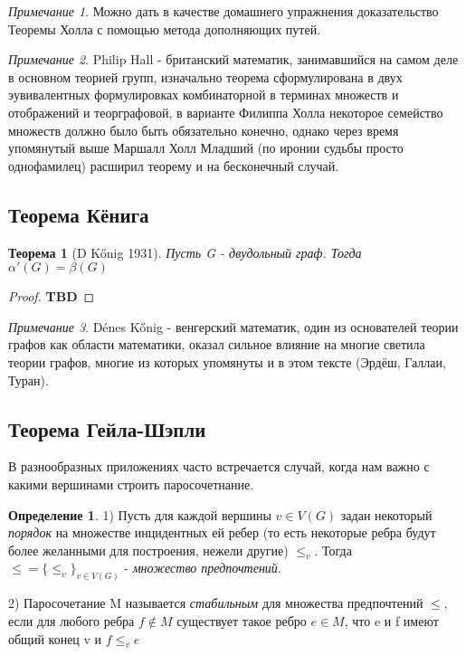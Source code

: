 \documentclass{article}
\renewcommand{\le}{\leqslant}
\newtheorem{theorem}{Теорема}
\theoremstyle{definition}
\newtheorem{definition}{Определение}[section]
\theoremstyle{remark}
\newtheorem*{remark}{Примечание}
\begin{document}
\begin{remark}
    Можно дать в качестве домашнего упражнения доказательство Теоремы Холла с помощью метода дополняющих путей.
\end{remark}

\begin{remark}
    Philip Hall - британский математик, занимавшийся на самом деле в основном теорией групп, изначально теорема сформулирована в двух эувивалентных формулировках комбинаторной в терминах множеств и отображений и теорграфовой, в варианте Филиппа Холла некоторое семейство множеств должно было быть обязательно конечно, однако через время упомянутый выше Маршалл Холл Младший (по иронии судьбы просто однофамилец) расширил теорему и на бесконечный случай.
\end{remark}

\subsection{Теорема Кёнига}

\begin{theorem} [D Kőnig 1931]
    Пусть G - двудольный граф. Тогда $\alpha'(G) = \beta(G)$
\end{theorem}

\begin{proof}
    \textbf{TBD}
\end{proof}

\begin{remark}
    Dénes Kőnig - венгерский математик, один из основателей теории графов как области математики, оказал сильное влияние на многие светила теории графов, многие из которых упомянуты и в этом тексте (Эрдёш, Галлаи, Туран). 
\end{remark}

\subsection{Теорема Гейла-Шэпли}

В разнообразных приложениях часто встречается случай, когда нам важно с какими вершинами строить паросочетнание. 

\begin{definition}
    1) Пусть для каждой вершины $v \in V(G)$ задан некоторый \textit{порядок} на множестве инцидентных ей ребер (то есть некоторые ребра будут более желанными для построения, нежели другие) $\le_v$. Тогда $\le = \{\le_v\}_{v \in V(G)}$ - \textit{множество предпочтений}.

    2) Паросочетание M называется \textit{стабильным} для множества предпочтений $\le$, если 
    для любого ребра $f \notin M$ существует такое ребро $e \in M$, что e и f имеют общий конец  v  и $f \le_v e$ 
\end{definition}
\end{document}
